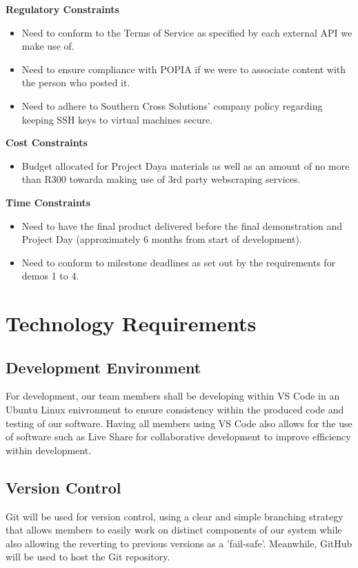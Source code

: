 \documentclass[12pt]{article}
\begin{document}
\textbf{Regulatory Constraints}
\begin{itemize}
  \item Need to conform to the Terms of Service as specified by each external API we make use of.
  \item Need to ensure compliance with POPIA if we were to associate content with the person who posted it.
  \item Need to adhere to Southern Cross Solutions' company policy regarding keeping SSH keys to virtual machines secure.
\end{itemize}

\textbf{Cost Constraints}
\begin{itemize}
  \item Budget allocated for Project Daya materials as well as an amount of no more than R300 towarda making use of 3rd party webscraping services.
\end{itemize}

\textbf{Time Constraints}
\begin{itemize}
  \item Need to have the final product delivered before the final demonstration and Project Day (approximately 6 months from start of development).
  \item Need to conform to milestone deadlines as set out by the requirements for demos 1 to 4.
\end{itemize}

\newpage

\section{Technology Requirements}

\subsection{Development Environment}
For development, our team members shall be developing within VS Code in an Ubuntu Linux enivronment to ensure consistency within the produced code and testing of our software. Having all members using VS Code also allows for the use of software such as Live Share for collaborative development to improve efficiency within development.

\subsection{Version Control}
Git will be used for version control, using a clear and simple branching strategy that allows members to easily work on distinct components of our system while also allowing the reverting to previous versions as a 'fail-safe'. Meanwhile, GitHub will be used to host the Git repository.
\end{document}
